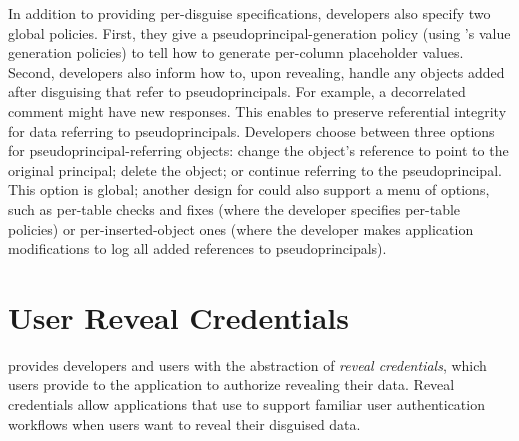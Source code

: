 In addition to providing per-disguise specifications, developers also specify
two global policies. First, they give \sys a pseudoprincipal-generation policy
(using \sys's value generation policies) to tell \sys how to generate per-column
placeholder values.
%
%
%
Second, developers also inform \sys how to, upon revealing, handle any objects
added after disguising that refer to pseudoprincipals. For example, a
decorrelated comment might have new responses. This enables \sys to preserve
referential integrity for data referring to pseudoprincipals. Developers choose
between three options for pseudoprincipal-referring objects: \one{} change the
object's reference to point to the original principal; \two{} delete the object;
or \three{} continue referring to the pseudoprincipal.
%
This option is global; another design for \sys could also support a menu of
options, such as per-table checks and fixes (where the developer specifies
per-table policies) or per-inserted-object ones (where the developer makes
application modifications to log all added references to pseudoprincipals).


%
%
%
%
%
%
%
%



\section{User Reveal Credentials}
\sys provides developers and users
with the abstraction of \emph{reveal credentials}, which users provide to the
application to authorize revealing their data.
%
Reveal credentials allow applications that use \sys to support familiar user authentication workflows
when users want to reveal their disguised data. 
%


